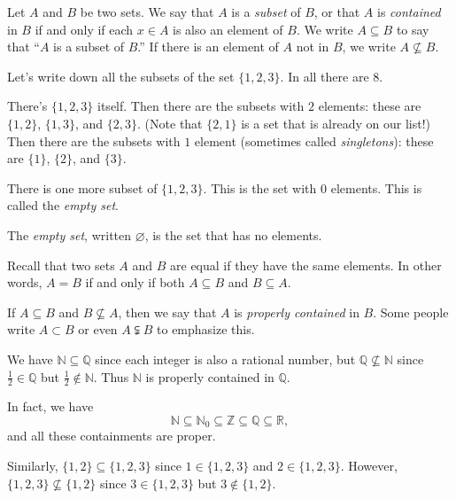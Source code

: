 \documentclass[11pt,dvipsnames]{book}
\numberwithin{figure}{section} %
\numberwithin{table}{section} %
\begin{document}
\begin{definition}
Let $A$ and $B$ be two sets.
We say that $A$ is a {\it subset} of $B$, or that $A$ is {\it contained} in $B$ if and only if each $x\in A$ is also an element of $B$.
We write $A \subseteq B$ to say that ``$A$ is a subset of $B$.''
If there is an element of $A$ not in $B$, we write $A\not\subseteq B$.
\end{definition}

\begin{example}
Let's write down all the subsets of the set $\{1,2,3\}$.
In all there are $8$.

There's $\{1,2,3\}$ itself.
Then there are the subsets with $2$ elements: these are $\{1,2\}$, $\{1,3\}$, and $\{2,3\}$.
(Note that $\{2,1\}$ is a set that is already on our list!)
Then there are the subsets with $1$ element (sometimes called \emph{singletons}): these are $\{1\}$, $\{2\}$, and $\{3\}$.

There is one more subset of $\{1,2,3\}$.
This is the set with $0$ elements.
This is called the \emph{empty set}.
\end{example}

\begin{definition}
The \emph{empty set}, written $\varnothing$, is the set that has no elements.
\end{definition}

\begin{example}
Recall that two sets $A$ and $B$ are equal if they have the same elements.
In other words, $A=B$ if and only if both $A \subseteq B$ and $B \subseteq A$.
\end{example}

If $A \subseteq B$ and $B \not\subseteq A$, then we say that $A$ is \emph{properly contained} in $B$.
Some people write $A \subset B$ or even $A \subsetneqq B$ to emphasize this.

\begin{example}
We have $\mathbb{N}\subseteq \mathbb{Q}$ since each integer is also a rational number, but $\mathbb{Q}\not\subseteq \mathbb{N}$ since $\frac{1}{2}\in \mathbb{Q}$ but $\frac{1}{2}\not\in \mathbb{N}$.
Thus $\mathbb{N}$ is properly contained in $\mathbb{Q}$.

In fact, we have
\[
\mathbb{N} \subseteq \mathbb{N}_0 \subseteq \mathbb{Z} \subseteq \mathbb{Q} \subseteq \mathbb{R},
\]
and all these containments are proper.

Similarly, $\{1,2\}\subseteq \{1,2,3\}$ since $1\in \{1,2,3\}$ and $2\in \{1,2,3\}$. However, $\{1,2,3\}\not\subseteq \{1,2\}$  since $3\in \{1,2,3\}$ but $3\not\in \{1,2\}$.
\end{example}
\end{document}
